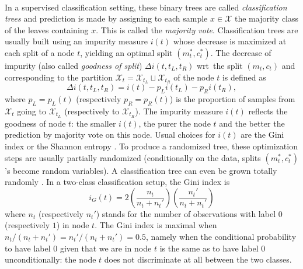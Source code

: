 \paragraph{}
In a supervised classification setting, these binary trees are called
\emph{classification trees} and prediction is made by assigning to each sample
$x \in \mathcal{X}$ the majority class of the leaves containing $x$. This is
called the \emph{majority vote}.  Classification trees are usually built using
an impurity measure $i(t)$ whose decrease is maximized at each split of a node
$t$, yielding an optimal split $(m_t^*, c_t^*)$. The decrease of impurity (also
called \emph{goodness of split}) $\Delta i(t, t_L, t_R)$ \acs{wrt}~the split
$(m_t, c_t)$ and corresponding to the partition
$\mathcal{X}_t=\mathcal{X}_{t_L}\sqcup \mathcal{X}_{t_R}$ of the node $t$ is
defined as
\begin{dmath}
    \label{ocrf:eq:impurity_measure_decrease}
    \Delta i(t, t_L, t_R) = i(t) - p_L i(t_L) - p_R i(t_R),
\end{dmath}
where $p_L = p_L(t)$ (respectively $p_R = p_R(t)$) is the proportion of samples
from $\mathcal{X}_t$ going to $\mathcal{X}_{t_L}$ (respectively to
$\mathcal{X}_{t_R}$).  The impurity measure $i(t)$ reflects the goodness of
node $t$: the smaller $i(t)$, the purer the node $t$ and the better the
prediction by majority vote on this node. Usual choices for $i(t)$ are the Gini
index \citep{Gini1912} or the Shannon entropy \citep{Shannon2001}.  To produce
a randomized tree, these optimization steps are usually partially randomized
(conditionally on the data, splits $(m_t^*, c_t^*)$'s become random variables).
A classification tree can even be grown totally randomly \citep{Geurts2006}.
%
In a two-class classification setup, the Gini index is
\begin{dmath}
    \label{ocrf:eq:gini}
    i_G(t) = 2\left(\frac{n_t}{n_t + n_t'}\right) \left( \frac{n_t'}{n_t +
    n_t'}\right)
\end{dmath}
where $n_t$ (respectively $n_t'$) stands for the number of observations with
label $0$ (respectively $1$) in node $t$. The Gini index is maximal when
$n_t/(n_t + n_t') = n_t'/(n_t + n_t')=0.5$, namely when the conditional
probability to have label $0$ given that we are in node $t$ is the same as to
have label $0$ unconditionally: the node $t$ does not discriminate at all
between the two classes.
